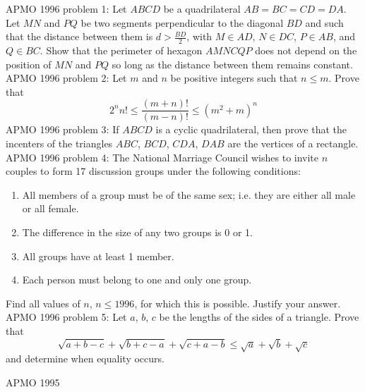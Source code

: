 APMO 1996 problem 1:  Let $ABCD$ be a quadrilateral $AB = BC = CD = DA$.  Let $MN$ and $PQ$ be two segments perpendicular to the diagonal $BD$ and such that the distance between them is $d > \frac{BD}{2}$, with $M \in AD$, $N \in DC$, $P \in AB$, and $Q \in BC$. Show that the perimeter of hexagon $AMNCQP$ does not depend on the position of $MN$ and $PQ$ so long as the distance between them remains constant. 
APMO 1996 problem 2:  Let $m$ and $n$ be positive integers such that $n \leq m$.  Prove that
\[ 2^n n! \leq \frac{(m+n)!}{(m-n)!} \leq (m^2 + m)^n \] 
APMO 1996 problem 3:  If $ABCD$ is a cyclic quadrilateral, then prove that the incenters of the triangles $ABC$, $BCD$, $CDA$, $DAB$ are the vertices of a rectangle. 
APMO 1996 problem 4:  The National Marriage Council wishes to invite $n$ couples to form 17 discussion groups under the following conditions:
\begin{enumerate}[(1)]
  \item All members of a group must be of the same sex; i.e. they are either all male or all female.
  \item The difference in the size of any two groups is 0 or 1.
  \item All groups have at least 1 member.
  \item Each person must belong to one and only one group.
\end{enumerate}
Find all values of $n$, $n \leq 1996$, for which this is possible.  Justify your answer. 
APMO 1996 problem 5:  Let $a$, $b$, $c$ be the lengths of the sides of a triangle.  Prove that
\[ \sqrt{a+b-c} + \sqrt{b+c-a} + \sqrt{c+a-b} \leq \sqrt{a} + \sqrt{b} + \sqrt{c} \]
and determine when equality occurs. 

APMO 1995 

